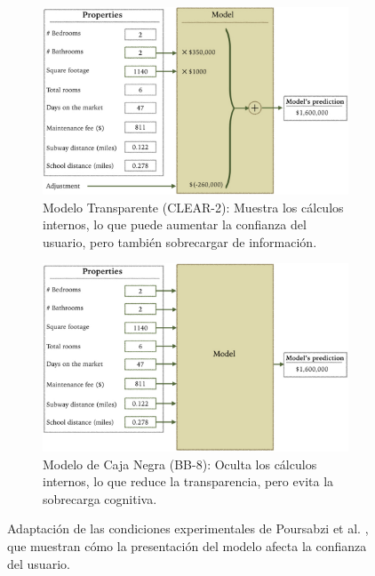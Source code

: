 \begin{figure}[H]
    \centering
    \begin{subfigure}[b]{0.72\textwidth}
        \centering
        \includegraphics[width=\textwidth]{include/clear_model.PNG}
        \caption{Modelo Transparente (CLEAR-2): Muestra los cálculos internos, lo que puede aumentar la confianza del usuario, pero también sobrecargar de información.}
        \label{fig:clear_model}
    \end{subfigure}
    
    \vspace{0.5cm} %
    
    \begin{subfigure}[b]{0.72\textwidth}
        \centering
        \includegraphics[width=\textwidth]{include/black_model.PNG}
        \caption{Modelo de Caja Negra (BB-8): Oculta los cálculos internos, lo que reduce la transparencia, pero evita la sobrecarga cognitiva.}
        \label{fig:black_model}
    \end{subfigure}
    \caption{Adaptación de las condiciones experimentales de Poursabzi et al. \cite{Poursabzi-2021}, que muestran cómo la presentación del modelo afecta la confianza del usuario.}
    \label{fig:confianza_visualizaciones}
\end{figure}


